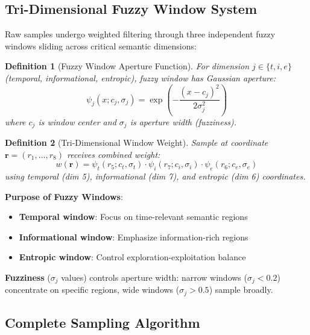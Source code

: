 \documentclass[12pt,a4paper]{article}
\newtheorem{definition}{Definition}
\begin{document}
\subsection{Tri-Dimensional Fuzzy Window System}

Raw samples undergo weighted filtering through three independent fuzzy windows sliding across critical semantic dimensions:

\begin{definition}[Fuzzy Window Aperture Function]
For dimension $j \in \{t, i, e\}$ (temporal, informational, entropic), fuzzy window has Gaussian aperture:
\begin{equation}
\psi_j(x; c_j, \sigma_j) = \exp\left(-\frac{(x - c_j)^2}{2\sigma_j^2}\right)
\end{equation}
where $c_j$ is window center and $\sigma_j$ is aperture width (fuzziness).
\end{definition}

\begin{definition}[Tri-Dimensional Window Weight]
Sample at coordinate $\mathbf{r} = (r_1, \ldots, r_8)$ receives combined weight:
\begin{equation}
w(\mathbf{r}) = \psi_t(r_5; c_t, \sigma_t) \cdot \psi_i(r_7; c_i, \sigma_i) \cdot \psi_e(r_6; c_e, \sigma_e)
\end{equation}
using temporal (dim 5), informational (dim 7), and entropic (dim 6) coordinates.
\end{definition}

\textbf{Purpose of Fuzzy Windows}:
\begin{itemize}
\item \textbf{Temporal window}: Focus on time-relevant semantic regions
\item \textbf{Informational window}: Emphasize information-rich regions
\item \textbf{Entropic window}: Control exploration-exploitation balance
\end{itemize}

\textbf{Fuzziness} ($\sigma_j$ values) controls aperture width: narrow windows ($\sigma_j < 0.2$) concentrate on specific regions, wide windows ($\sigma_j > 0.5$) sample broadly.

\subsection{Complete Sampling Algorithm}
\end{document}

